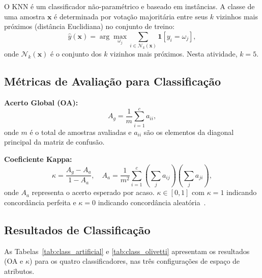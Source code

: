 \documentclass[12pt, a4paper]{article}
\newcommand{\bx}{\mathbf{x}}
\begin{document}
O KNN é um classificador não-paramétrico e baseado em instâncias. A classe de uma amostra $\bx$ é determinada por votação majoritária entre seus $k$ vizinhos mais próximos (distância Euclidiana) no conjunto de treino:
\begin{equation}
    \hat{y}(\bx) = \arg\max_{\omega_j} \sum_{i \in \mathcal{N}_k(\bx)} \mathbf{1}[y_i = \omega_j],
    \label{eq:knn}
\end{equation}
onde $\mathcal{N}_k(\bx)$ é o conjunto dos $k$ vizinhos mais próximos. Nesta atividade, $k = 5$.

\subsection{Métricas de Avaliação para Classificação}
\label{sec:metricas_class}

\textbf{Acerto Global (OA):}
\begin{equation}
    A_g = \frac{1}{m} \sum_{i=1}^{c} a_{ii},
    \label{eq:oa}
\end{equation}
onde $m$ é o total de amostras avaliadas e $a_{ii}$ são os elementos da diagonal principal da matriz de confusão.

\textbf{Coeficiente Kappa:}
\begin{equation}
    \kappa = \frac{A_g - A_a}{1 - A_a}, \quad A_a = \frac{1}{m^2} \sum_{i=1}^{c} \left(\sum_j a_{ij}\right)\!\left(\sum_j a_{ji}\right),
    \label{eq:kappa}
\end{equation}
onde $A_a$ representa o acerto esperado por acaso. $\kappa \in [0,1]$ com $\kappa = 1$ indicando concordância perfeita e $\kappa = 0$ indicando concordância aleatória~\cite{negri2021}.

\subsection{Resultados de Classificação}
\label{sec:res_class}

As Tabelas~\ref{tab:class_artificial} e \ref{tab:class_olivetti} apresentam os resultados (OA e $\kappa$) para os quatro classificadores, nas três configurações de espaço de atributos.
\end{document}
